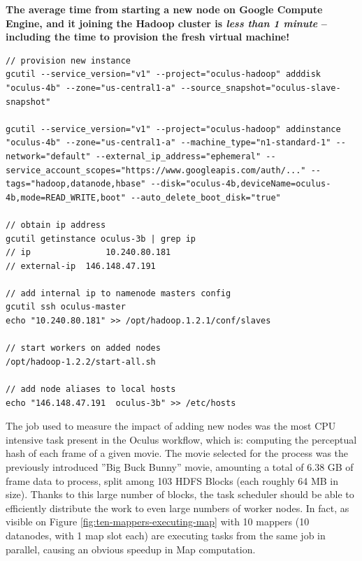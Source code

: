 \textbf{The average time from starting a new node on Google Compute Engine, and it joining the Hadoop cluster is \textit{less than 1 minute} -- including the time to provision the fresh virtual machine!}

\newpage
\begin{lstlisting}[caption={Complete listing of adding a new worker node to the cluster, using GCE}, label={lst:adding-new-node-cluster}]
// provision new instance
gcutil --service_version="v1" --project="oculus-hadoop" adddisk "oculus-4b" --zone="us-central1-a" --source_snapshot="oculus-slave-snapshot"

gcutil --service_version="v1" --project="oculus-hadoop" addinstance "oculus-4b" --zone="us-central1-a" --machine_type="n1-standard-1" --network="default" --external_ip_address="ephemeral" --service_account_scopes="https://www.googleapis.com/auth/..." --tags="hadoop,datanode,hbase" --disk="oculus-4b,deviceName=oculus-4b,mode=READ_WRITE,boot" --auto_delete_boot_disk="true"

// obtain ip address
gcutil getinstance oculus-3b | grep ip
// ip               10.240.80.181
// external-ip  146.148.47.191

// add internal ip to namenode masters config
gcutil ssh oculus-master
echo "10.240.80.181" >> /opt/hadoop.1.2.1/conf/slaves

// start workers on added nodes
/opt/hadoop-1.2.2/start-all.sh

// add node aliases to local hosts
echo "146.148.47.191  oculus-3b" >> /etc/hosts
\end{lstlisting}

The job used to measure the impact of adding new nodes was the most CPU intensive task present in the Oculus workflow, which is: computing the perceptual hash of each frame of a given movie. The movie selected for the process was the previously introduced ''Big Buck Bunny'' movie, amounting a total of 6.38 GB of frame data to process, split among 103 HDFS Blocks (each roughly 64 MB in size). Thanks to this large number of blocks, the task scheduler should be able to efficiently distribute the work to even large numbers of worker nodes. In fact, as visible on Figure \ref{fig:ten-mappers-executing-map} with 10 mappers (10 datanodes, with 1 map slot each) are executing tasks from the same job in parallel, causing an obvious speedup in Map computation.


